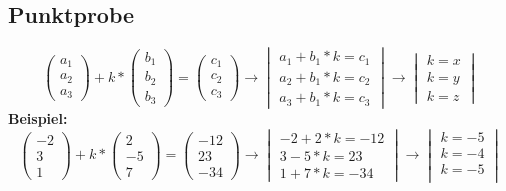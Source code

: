 	\subsection{Punktprobe}
		$$
\begin{pmatrix} 
a_{1} \\
a_{2} \\
a_{3}
\end{pmatrix}+k*
\begin{pmatrix} 
b_{1} \\
b_{2} \\
b_{3}
\end{pmatrix}=
\begin{pmatrix} 
c_{1} \\
c_{2} \\
c_{3}
\end{pmatrix} \rightarrow
\begin{vmatrix}
a_{1}+b_{1}*k=c_{1} \\
a_{2}+b_{1}*k=c_{2} \\
a_{3}+b_{1}*k=c_{3}
\end{vmatrix} \rightarrow
\begin{vmatrix}
k=x \\
k=y \\
k=z
\end{vmatrix}
$$
		\textbf{Beispiel:}
			$$
\begin{pmatrix} 
-2 \\
3 \\
1
\end{pmatrix}+k*
\begin{pmatrix} 
2 \\
-5 \\
7
\end{pmatrix}=
\begin{pmatrix} 
-12 \\
23 \\
-34
\end{pmatrix} \rightarrow
\begin{vmatrix}
-2+2*k=-12\\
3-5*k=23\\
1+7*k=-34
\end{vmatrix} \rightarrow
\begin{vmatrix}
k=-5 \\
k=-4 \\
k=-5 \\
\end{vmatrix}
$$
